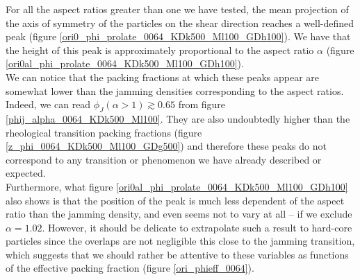 \documentclass[class=report, float=false, crop=false]{standalone}
\begin{document}
For all the aspect ratios greater than one we have tested, the mean projection of the axis of symmetry of the particles on the shear direction reaches a well-defined peak (figure \ref{ori0_phi_prolate_0064_KDk500_Ml100_GDh100}). We have that the height of this peak is approximately proportional to the aspect ratio $\alpha$ (figure \ref{ori0al_phi_prolate_0064_KDk500_Ml100_GDh100}).\\

We can notice that the packing fractions at which these peaks appear are somewhat lower than the jamming densities corresponding to the aspect ratios. Indeed, we can read $\phi_J(\alpha>1) \gtrsim 0.65$ from figure \ref{phij_alpha_0064_KDk500_Ml100}. They are also undoubtedly higher than the rheological transition packing fractions (figure \ref{z_phi_0064_KDk500_Ml100_GDg500}) and therefore these peaks do not correspond to any transition or phenomenon we have already described or expected.\\

Furthermore, what figure \ref{ori0al_phi_prolate_0064_KDk500_Ml100_GDh100} also shows is that the position of the peak is much less dependent of the aspect ratio than the jamming density, and even seems not to vary at all -- if we exclude $\alpha=1.02$. However, it should be delicate to extrapolate such a result to hard-core particles since the overlaps are not negligible this close to the jamming transition, which suggests that we should rather be attentive to these variables as functions of the effective packing fraction (figure \ref{ori_phieff_0064}).
\end{document}
